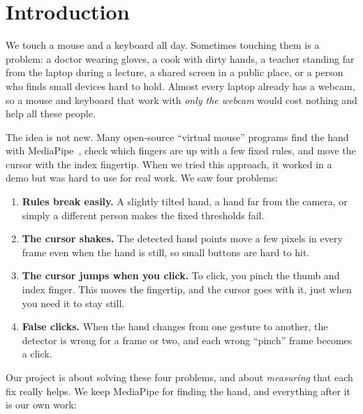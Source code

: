 \section{Introduction}
\label{sec:intro}

We touch a mouse and a keyboard all day. Sometimes touching them is a problem:
a doctor wearing gloves, a cook with dirty hands, a teacher standing far from
the laptop during a lecture, a shared screen in a public place, or a person
who finds small devices hard to hold. Almost every laptop already has a
webcam, so a mouse and keyboard that work with \emph{only the webcam} would
cost nothing and help all these people.

The idea is not new. Many open-source ``virtual mouse'' programs find the
hand with MediaPipe~\cite{zhang2020mediapipe}, check which fingers are up with
a few fixed rules, and move the cursor with the index fingertip. When we tried
this approach, it worked in a demo but was hard to use for real work. We saw
four problems:
\begin{enumerate}
\item \textbf{Rules break easily.} A slightly tilted hand, a hand far from the
camera, or simply a different person makes the fixed thresholds fail.
\item \textbf{The cursor shakes.} The detected hand points move a few pixels
in every frame even when the hand is still, so small buttons are hard to hit.
\item \textbf{The cursor jumps when you click.} To click, you pinch the thumb
and index finger. This moves the fingertip, and the cursor goes with it, just
when you need it to stay still.
\item \textbf{False clicks.} When the hand changes from one gesture to another,
the detector is wrong for a frame or two, and each wrong ``pinch'' frame
becomes a click.
\end{enumerate}

Our project is about solving these four problems, and about \emph{measuring}
that each fix really helps. We keep MediaPipe for finding the hand, and
everything after it is our own work:

